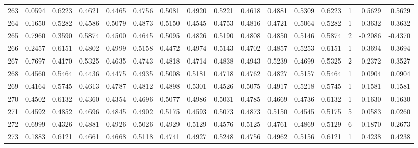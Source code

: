 \begin{tabular}{lrrrrrrrrrrrrrrr}
263 &      0.0594 &  0.6223 &  0.4621 &  0.4465 &  0.4756 &  0.5081 &  0.4920 &  0.5221 &  0.4618 &  0.4881 &   0.5309 &     0.6223 &      1 &                    0.5629 &                     0.5629 \\
264 &      0.1650 &  0.5282 &  0.4586 &  0.5079 &  0.4873 &  0.5150 &  0.4545 &  0.4753 &  0.4816 &  0.4721 &   0.5064 &     0.5282 &      1 &                    0.3632 &                     0.3632 \\
265 &      0.7960 &  0.3590 &  0.5874 &  0.4500 &  0.4645 &  0.5095 &  0.4826 &  0.5190 &  0.4808 &  0.4850 &   0.5146 &     0.5874 &      2 &                   -0.2086 &                    -0.4370 \\
266 &      0.2457 &  0.6151 &  0.4802 &  0.4999 &  0.5158 &  0.4472 &  0.4974 &  0.5143 &  0.4702 &  0.4857 &   0.5253 &     0.6151 &      1 &                    0.3694 &                     0.3694 \\
267 &      0.7697 &  0.4170 &  0.5325 &  0.4635 &  0.4743 &  0.4818 &  0.4714 &  0.4838 &  0.4943 &  0.5239 &   0.4699 &     0.5325 &      2 &                   -0.2372 &                    -0.3527 \\
268 &      0.4560 &  0.5464 &  0.4436 &  0.4475 &  0.4935 &  0.5008 &  0.5181 &  0.4718 &  0.4762 &  0.4827 &   0.5157 &     0.5464 &      1 &                    0.0904 &                     0.0904 \\
269 &      0.4164 &  0.5745 &  0.4613 &  0.4787 &  0.4812 &  0.4898 &  0.5301 &  0.4526 &  0.5075 &  0.4917 &   0.5218 &     0.5745 &      1 &                    0.1581 &                     0.1581 \\
270 &      0.4502 &  0.6132 &  0.4360 &  0.4354 &  0.4696 &  0.5077 &  0.4986 &  0.5031 &  0.4785 &  0.4669 &   0.4736 &     0.6132 &      1 &                    0.1630 &                     0.1630 \\
271 &      0.4592 &  0.4852 &  0.4696 &  0.4845 &  0.4902 &  0.5175 &  0.4593 &  0.5073 &  0.4873 &  0.5150 &   0.4545 &     0.5175 &      5 &                    0.0583 &                     0.0260 \\
272 &      0.6999 &  0.4326 &  0.4881 &  0.4926 &  0.5026 &  0.4929 &  0.5129 &  0.4576 &  0.5125 &  0.4761 &   0.4869 &     0.5129 &      6 &                   -0.1870 &                    -0.2673 \\
273 &      0.1883 &  0.6121 &  0.4661 &  0.4668 &  0.5118 &  0.4741 &  0.4927 &  0.5248 &  0.4756 &  0.4962 &   0.5156 &     0.6121 &      1 &                    0.4238 &                     0.4238 \\

\end{tabular}

